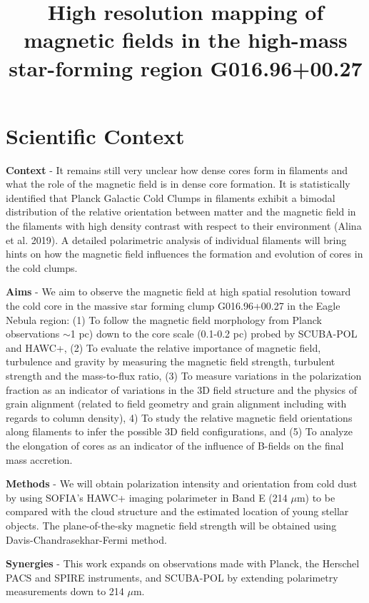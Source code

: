 \documentclass[11pt]{amsart}
\title{High resolution mapping of magnetic fields in the high-mass star-forming region  G016.96+00.27}
\begin{document}
\maketitle


\section{Scientific Context}
{\bf Context} - It remains still very unclear how dense cores form in filaments and what the role of the  magnetic field is in dense core formation. 
It is statistically identified that Planck Galactic Cold Clumps in filaments exhibit a bimodal distribution of the relative orientation between matter and the magnetic field in the filaments with high density contrast with respect to their environment (Alina et al. 2019).  A detailed polarimetric analysis of individual filaments will bring hints on how the magnetic field influences the formation and evolution of cores in the cold clumps.


{\bf Aims} - We aim to observe the magnetic field at high spatial resolution toward the 
cold core in the massive star forming clump G016.96+00.27 in the Eagle Nebula region:
(1) To follow the magnetic field morphology from Planck observations $\sim$1 pc) down to the core scale (0.1-0.2 pc) probed by SCUBA-POL and HAWC+, 
(2) To evaluate the relative importance of magnetic field, turbulence and gravity by measuring the magnetic field strength, turbulent strength and the mass-to-flux ratio, 
(3) To measure variations in the polarization fraction 
as an indicator of variations in the 3D field structure and the physics of grain alignment (related to field geometry and grain alignment including with regards to column density),  
4) To study the relative magnetic field orientations along filaments to infer the possible 3D field configurations,
and 
(5) To analyze the elongation of cores 
as an indicator of the influence of B-fields on the final mass accretion.

{\bf Methods} - 
We will obtain polarization intensity and orientation from cold dust by using SOFIA's HAWC+ imaging polarimeter in Band E (214 $\mu$m) to be compared with the cloud structure and the 
estimated location of young stellar objects. The plane-of-the-sky magnetic field strength will be obtained using Davis-Chandrasekhar-Fermi method. 

{\bf Synergies} - This work expands on observations made with Planck, the Herschel PACS and SPIRE instruments, and SCUBA-POL by extending polarimetry measurements down to 214 $\mu$m. 
\end{document}
